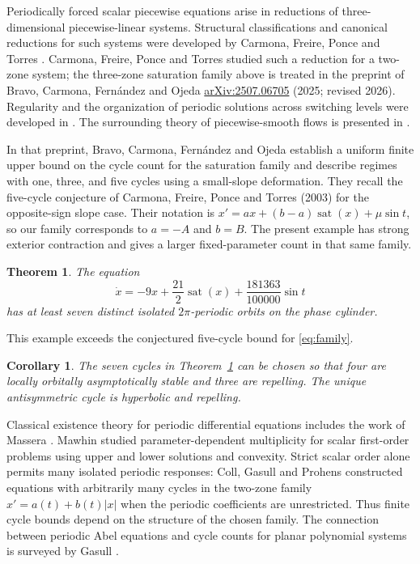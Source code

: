 \documentclass[11pt,a4paper]{article}
\newtheorem{theorem}{Theorem}
\newtheorem{corollary}{Corollary}
\newcommand{\sat}{\operatorname{sat}}
\begin{document}
Periodically forced scalar piecewise equations arise in reductions of
three-dimensional piecewise-linear systems. Structural classifications
and canonical reductions for such systems were developed by
Carmona, Freire, Ponce and Torres \cite{Carmona2002}.
Carmona, Freire, Ponce and
Torres \cite{Carmona2004} studied such a reduction for a two-zone system;
the three-zone saturation family above is treated in the preprint of
Bravo, Carmona, Fern\'andez and Ojeda
\href{https://arxiv.org/abs/2507.06705}{arXiv:2507.06705} (2025; revised 2026).
Regularity and the organization of periodic solutions across switching
levels were developed in \cite{Bravo2007}. The surrounding theory of
piecewise-smooth flows is presented in \cite{diBernardo2008}.

In that preprint, Bravo, Carmona, Fern\'andez and Ojeda establish
a uniform finite upper bound on the cycle count for the saturation family and describe
regimes with one, three, and five cycles using a small-slope deformation.
They recall the five-cycle conjecture of Carmona, Freire, Ponce and
Torres (2003) for the opposite-sign slope case. Their notation is
$x'=ax+(b-a)\sat(x)+\mu\sin t$, so our family corresponds to
$a=-A$ and $b=B$. The present example has strong exterior contraction
and gives a larger fixed-parameter count in that same family.

\begin{theorem}\label{thm:seven}
The equation
\begin{equation}\label{eq:witness}
 \boxed{\dot x=-9x+\frac{21}{2}\sat(x)+\frac{181363}{100000}\sin t}
\end{equation}
has at least seven distinct isolated $2\pi$-periodic orbits on the phase cylinder.
\end{theorem}
This example exceeds the conjectured five-cycle bound for \eqref{eq:family}.
\begin{corollary}\label{cor:stability}
The seven cycles in Theorem~\ref{thm:seven} can be chosen so that four
are locally orbitally asymptotically stable and three are repelling. The unique
antisymmetric cycle is hyperbolic and repelling.
\end{corollary}

Classical existence theory for periodic differential equations includes
the work of Massera \cite{Massera1950}. Mawhin \cite{Mawhin1987}
studied parameter-dependent multiplicity for scalar first-order problems
using upper and lower solutions and convexity. Strict scalar order alone
permits many isolated periodic responses: Coll, Gasull and Prohens
\cite{Coll2008} constructed equations with arbitrarily many cycles in
the two-zone family $x'=a(t)+b(t)|x|$ when the periodic coefficients are
unrestricted. Thus finite cycle bounds depend on the structure of the
chosen family. The connection between periodic Abel equations and
cycle counts for planar polynomial systems is surveyed by Gasull
\cite{Gasull2024}.
\end{document}
